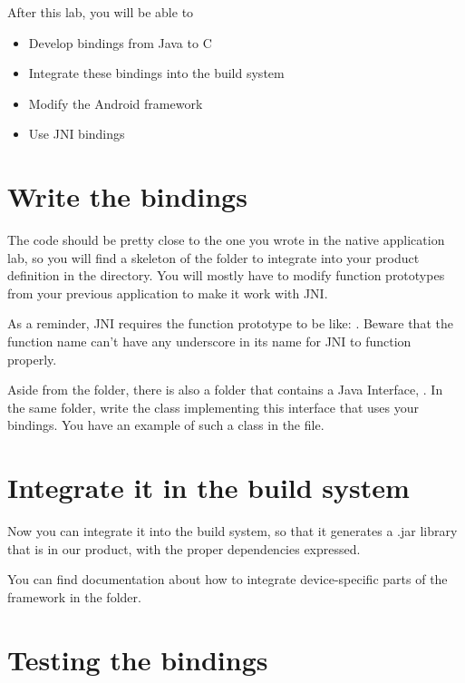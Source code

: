
After this lab, you will be able to
\begin{itemize}
  \item Develop bindings from Java to C
  \item Integrate these bindings into the build system
  \item Modify the Android framework
  \item Use JNI bindings
\end{itemize}

\section{Write the bindings}

The code should be pretty close to the one you wrote in the native
application lab, so you will find a skeleton of the folder to
integrate into your product definition in the
 directory. You will
mostly have to modify function prototypes from your previous
application to make it work with JNI.

As a reminder, JNI requires the function prototype to be like:
.
Beware that the function name can't have any underscore in its name
for JNI to function properly.

Aside from the  folder, there is also a  folder that
contains a Java Interface, . In the same folder,
write the  class implementing this interface that uses your
bindings. You have an example of such a class in the 
file.

\section{Integrate it in the build system}

Now you can integrate it into the build system, so that it generates a .jar
library that is in our product, with the proper dependencies expressed.

You can find documentation about how to integrate device-specific parts of the
framework in the  folder.

\section{Testing the bindings}

